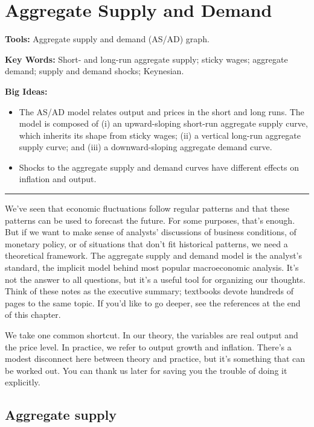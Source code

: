 \chapter{Aggregate Supply and Demand}\label{chp:asad}
\hypertarget{asad}{}

\textbf{Tools:} Aggregate supply and demand (AS/AD) graph.

\textbf{Key Words:} Short- and long-run aggregate supply; sticky wages;
aggregate demand; supply and demand shocks; Keynesian.

\textbf{Big Ideas:}
\vspace{-0.1in}
\begin{itemize}
\item The AS/AD model relates output and prices in the short and long runs.
The model is composed of (i) an upward-sloping short-run aggregate supply curve,
which inherits its shape from sticky wages;
(ii) a vertical long-run aggregate supply curve;
and (iii) a downward-sloping aggregate demand curve.
\item Shocks to the aggregate supply and demand curves
have different effects on inflation and output.
\end{itemize}
\rule{\textwidth}{1pt}

We've seen that economic fluctuations follow regular patterns
and that these patterns can be used to forecast the future.
For some purposes, that's enough.
But if we want to make sense of analysts' discussions of business conditions,
of monetary policy,
or of situations that don't fit historical patterns,
we need a theoretical framework.
The aggregate supply and demand model is the analyst's standard,
the implicit model behind most popular macroeconomic analysis.
It's not the answer to all questions,
but it's a useful tool for organizing our thoughts.
Think of these notes as the executive summary;
textbooks devote hundreds of pages to the same topic.
If you'd like to go deeper, see the references at the end of this chapter.

We take one common shortcut.
In our theory, the variables are real output and the price level.
In practice, we refer to output growth and inflation.
There's a modest disconnect here between theory and practice,
but it's something that can be worked out.
You can thank us later for saving you the trouble of
doing it explicitly.


\section{Aggregate supply}

